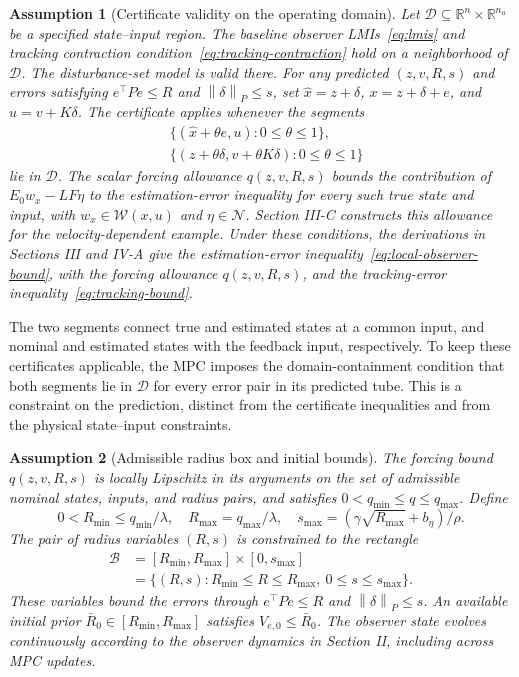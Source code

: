 \documentclass[11pt,a4paper]{article}
\numberwithin{equation}{section}
\newtheorem{assumption}{Assumption}
\theoremstyle{remark}\newtheorem{remark}{Remark}
\newcommand{\R}{\mathbb R}
\newcommand{\norm}[1]{\left\lVert#1\right\rVert}
\newcommand{\cD}{\mathcal D}
\begin{document}
\begin{assumption}[Certificate validity on the operating domain]\label{ass:domain}
Let $\cD\subseteq\R^n\times\R^{n_u}$ be a specified state--input region. The baseline observer LMIs~\eqref{eq:lmis} and tracking contraction condition~\eqref{eq:tracking-contraction} hold on a neighborhood of $\cD$. The disturbance-set model is valid there. For any predicted $(z,v,R,s)$ and errors satisfying $e^\top Pe\le R$ and $\norm\delta_P\le s$, set $\hat x=z+\delta$, $x=z+\delta+e$, and $u=v+K\delta$. The certificate applies whenever the segments
\[
\begin{aligned}
&\{(\hat x+\theta e,u):0\le\theta\le1\},\\
&\{(z+\theta\delta,v+\theta K\delta):0\le\theta\le1\}
\end{aligned}
\]
lie in $\cD$. The scalar forcing allowance $q(z,v,R,s)$ bounds the contribution of $E_0w_x-LF\eta$ to the estimation-error inequality for every such true state and input, with $w_x\in\mathcal W(x,u)$ and $\eta\in\mathcal N$. Section III-C constructs this allowance for the velocity-dependent example. Under these conditions, the derivations in Sections III and IV-A give the estimation-error inequality~\eqref{eq:local-observer-bound}, with the forcing allowance $q(z,v,R,s)$, and the tracking-error inequality~\eqref{eq:tracking-bound}.
\end{assumption}
The two segments connect true and estimated states at a common input, and nominal and estimated states with the feedback input, respectively. To keep these certificates applicable, the MPC imposes the domain-containment condition that both segments lie in $\cD$ for every error pair in its predicted tube. This is a constraint on the prediction, distinct from the certificate inequalities and from the physical state--input constraints.
\begin{assumption}[Admissible radius box and initial bounds]\label{ass:radii}
The forcing bound $q(z,v,R,s)$ is locally Lipschitz in its arguments on the set of admissible nominal states, inputs, and radius pairs, and satisfies
$0<q_{\min}\le q\le q_{\max}$. Define
\begin{equation}
0<R_{\min}\le q_{\min}/\lambda,\quad R_{\max}=q_{\max}/\lambda,\quad
s_{\max}=(\gamma\sqrt{R_{\max}}+b_\eta)/\rho.
\end{equation}
The pair of radius variables $(R,s)$ is constrained to the rectangle
\[
\begin{aligned}
\mathcal B&=[R_{\min},R_{\max}]\times[0,s_{\max}]\\
&=\{(R,s):R_{\min}\le R\le R_{\max},\ 0\le s\le s_{\max}\}.
\end{aligned}
\]
These variables bound the errors through $e^\top Pe\le R$ and $\norm\delta_P\le s$. An available initial prior $\bar R_0\in[R_{\min},R_{\max}]$ satisfies $V_{e,0}\le\bar R_0$. The observer state evolves continuously according to the observer dynamics in Section II, including across MPC updates.
\end{assumption}
\end{document}
